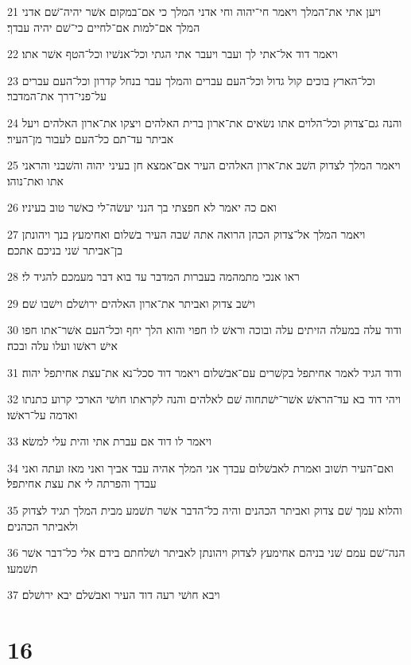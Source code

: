 \par 21 ויען אתי את־המלך ויאמר חי־יהוה וחי אדני המלך כי אם־במקום אשׁר יהיה־שׁם אדני המלך אם־למות אם־לחיים כי־שׁם יהיה עבדך׃
\par 22 ויאמר דוד אל־אתי לך ועבר ויעבר אתי הגתי וכל־אנשׁיו וכל־הטף אשׁר אתו׃
\par 23 וכל־הארץ בוכים קול גדול וכל־העם עברים והמלך עבר בנחל קדרון וכל־העם עברים על־פני־דרך את־המדבר׃
\par 24 והנה גם־צדוק וכל־הלוים אתו נשׂאים את־ארון ברית האלהים ויצקו את־ארון האלהים ויעל אביתר עד־תם כל־העם לעבור מן־העיר׃
\par 25 ויאמר המלך לצדוק השׁב את־ארון האלהים העיר אם־אמצא חן בעיני יהוה והשׁבני והראני אתו ואת־נוהו׃
\par 26 ואם כה יאמר לא חפצתי בך הנני יעשׂה־לי כאשׁר טוב בעיניו׃
\par 27 ויאמר המלך אל־צדוק הכהן הרואה אתה שׁבה העיר בשׁלום ואחימעץ בנך ויהונתן בן־אביתר שׁני בניכם אתכם׃
\par 28 ראו אנכי מתמהמה בעברות המדבר עד בוא דבר מעמכם להגיד לי׃
\par 29 וישׁב צדוק ואביתר את־ארון האלהים ירושׁלם וישׁבו שׁם׃
\par 30 ודוד עלה במעלה הזיתים עלה ובוכה וראשׁ לו חפוי והוא הלך יחף וכל־העם אשׁר־אתו חפו אישׁ ראשׁו ועלו עלה ובכה׃
\par 31 ודוד הגיד לאמר אחיתפל בקשׁרים עם־אבשׁלום ויאמר דוד סכל־נא את־עצת אחיתפל יהוה׃
\par 32 ויהי דוד בא עד־הראשׁ אשׁר־ישׁתחוה שׁם לאלהים והנה לקראתו חושׁי הארכי קרוע כתנתו ואדמה על־ראשׁו׃
\par 33 ויאמר לו דוד אם עברת אתי והית עלי למשׂא׃
\par 34 ואם־העיר תשׁוב ואמרת לאבשׁלום עבדך אני המלך אהיה עבד אביך ואני מאז ועתה ואני עבדך והפרתה לי את עצת אחיתפל׃
\par 35 והלוא עמך שׁם צדוק ואביתר הכהנים והיה כל־הדבר אשׁר תשׁמע מבית המלך תגיד לצדוק ולאביתר הכהנים׃
\par 36 הנה־שׁם עמם שׁני בניהם אחימעץ לצדוק ויהונתן לאביתר ושׁלחתם בידם אלי כל־דבר אשׁר תשׁמעו׃
\par 37 ויבא חושׁי רעה דוד העיר ואבשׁלם יבא ירושׁלם׃

\chapter{16}

